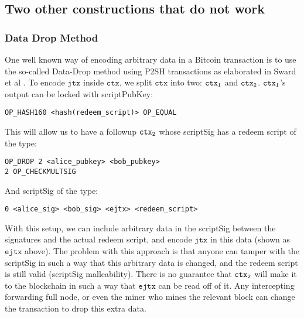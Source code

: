 \subsection{Two other constructions that do not work}

\subsubsection{Data Drop Method}
One well known way of encoding arbitrary data in a Bitcoin transaction is to use the so-called Data-Drop method using P2SH transactions as elaborated in Sward et al \cite{sward2018data}. To encode $\texttt{jtx}$ inside $\texttt{ctx}$, we split $\texttt{ctx}$ into two: $\texttt{ctx\textsubscript{1}}$ and $\texttt{ctx\textsubscript{2}}$. $\texttt{ctx\textsubscript{1}}$'s output can be locked with scriptPubKey:

\begin{verbatim}
OP_HASH160 <hash(redeem_script)> OP_EQUAL
\end{verbatim}

This will allow us to have a followup $\texttt{ctx\textsubscript{2}}$ whose scriptSig has a redeem script of the type:
\begin{verbatim}
OP_DROP 2 <alice_pubkey> <bob_pubkey>
2 OP_CHECKMULTSIG
\end{verbatim}

And scriptSig of the type:
\noindent
\begin{verbatim}
0 <alice_sig> <bob_sig> <ejtx> <redeem_script>
\end{verbatim}

With this setup, we can include arbitrary data in the scriptSig between the signatures and the actual redeem script, and encode $\texttt{jtx}$ in this data (shown as $\texttt{ejtx}$ above). The problem with this approach is that anyone can tamper with the scriptSig in such a way that this arbitrary data is changed, and the redeem script is still valid (scriptSig malleability). There is no guarantee that $\texttt{ctx\textsubscript{2}}$ will make it to the blockchain in such a way that $\texttt{ejtx}$ can be read off of it. Any intercepting forwarding full node, or even the miner who mines the relevant block can change the transaction to drop this extra data.

